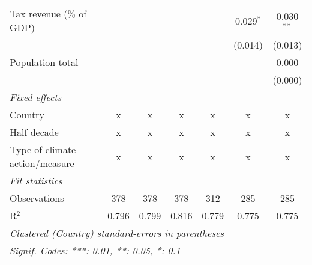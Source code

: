 \begin{tabular}{lcccccc}
   Tax revenue (\% of GDP)                         &         &         &                &                & 0.029$^{*}$    & 0.030$^{**}$\\   
                                                   &         &         &                &                & (0.014)        & (0.013)\\   
   Population total                                &         &         &                &                &                & 0.000\\   
                                                   &         &         &                &                &                & (0.000)\\   
   \emph{Fixed effects}\\
   Country                                         & x       & x       & x              & x              & x              & x\\  
   Half decade                                     & x       & x       & x              & x              & x              & x\\  
   Type of climate action/measure                  & x       & x       & x              & x              & x              & x\\  
   \midrule \emph{Fit statistics}\\
   Observations                                    & 378     & 378     & 378            & 312            & 285            & 285\\  
   R$^2$                                           & 0.796   & 0.799   & 0.816          & 0.779          & 0.775          & 0.775\\  
   \midrule
   \multicolumn{7}{l}{\emph{Clustered (Country) standard-errors in parentheses}}\\
   \multicolumn{7}{l}{\emph{Signif. Codes: ***: 0.01, **: 0.05, *: 0.1}}\\
\end{tabular}
\par\endgroup


